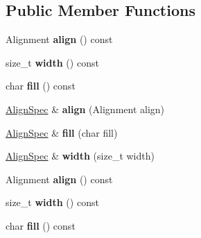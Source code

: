 \subsection*{Public Member Functions}
\begin{DoxyCompactItemize}
\item 
Alignment {\bfseries align} () const \hypertarget{classgxx_1_1io_1_1AlignSpec_afa7b7b5e2307afc61fa158f33587cfa4}{}\label{classgxx_1_1io_1_1AlignSpec_afa7b7b5e2307afc61fa158f33587cfa4}

\item 
size\+\_\+t {\bfseries width} () const \hypertarget{classgxx_1_1io_1_1AlignSpec_a4025e3512a41207919ba0710aac5004e}{}\label{classgxx_1_1io_1_1AlignSpec_a4025e3512a41207919ba0710aac5004e}

\item 
char {\bfseries fill} () const \hypertarget{classgxx_1_1io_1_1AlignSpec_a055233b3c0e5558ba2bbfd1b6b2da858}{}\label{classgxx_1_1io_1_1AlignSpec_a055233b3c0e5558ba2bbfd1b6b2da858}

\item 
\hyperlink{classgxx_1_1io_1_1AlignSpec}{Align\+Spec} \& {\bfseries align} (Alignment align)\hypertarget{classgxx_1_1io_1_1AlignSpec_aaeae9560ec73fe1d3bcfbf556fc47e26}{}\label{classgxx_1_1io_1_1AlignSpec_aaeae9560ec73fe1d3bcfbf556fc47e26}

\item 
\hyperlink{classgxx_1_1io_1_1AlignSpec}{Align\+Spec} \& {\bfseries fill} (char fill)\hypertarget{classgxx_1_1io_1_1AlignSpec_a6f82e3aab453ce2ea5d93e37da6f3b01}{}\label{classgxx_1_1io_1_1AlignSpec_a6f82e3aab453ce2ea5d93e37da6f3b01}

\item 
\hyperlink{classgxx_1_1io_1_1AlignSpec}{Align\+Spec} \& {\bfseries width} (size\+\_\+t width)\hypertarget{classgxx_1_1io_1_1AlignSpec_a0cd7069f31fe0c417633f96c527b242b}{}\label{classgxx_1_1io_1_1AlignSpec_a0cd7069f31fe0c417633f96c527b242b}

\item 
Alignment {\bfseries align} () const \hypertarget{classgxx_1_1io_1_1AlignSpec_afa7b7b5e2307afc61fa158f33587cfa4}{}\label{classgxx_1_1io_1_1AlignSpec_afa7b7b5e2307afc61fa158f33587cfa4}

\item 
size\+\_\+t {\bfseries width} () const \hypertarget{classgxx_1_1io_1_1AlignSpec_a4025e3512a41207919ba0710aac5004e}{}\label{classgxx_1_1io_1_1AlignSpec_a4025e3512a41207919ba0710aac5004e}

\item 
char {\bfseries fill} () const \hypertarget{classgxx_1_1io_1_1AlignSpec_a055233b3c0e5558ba2bbfd1b6b2da858}{}\label{classgxx_1_1io_1_1AlignSpec_a055233b3c0e5558ba2bbfd1b6b2da858}


\end{DoxyCompactItemize}
